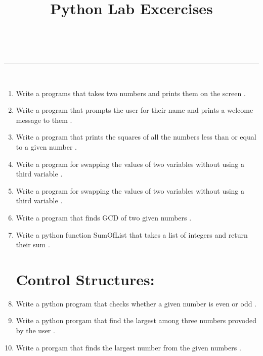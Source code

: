 \documentclass[a4paper,11pt]{article}
\makeatletter
\newcommand{\linia}{\rule{\linewidth}{0.5pt}}
\theoremstyle{mytheor}
\renewcommand{\maketitle}{
\begin{center}
\vspace{2ex}
{\huge \textsc{\@title}}
\vspace{1ex}
\\
\linia\\
\@author \hfill \@date
\vspace{4ex}
\end{center}
}
\makeatother
\begin{document}
\title{Python Lab Excercises}

\maketitle
\begin{enumerate}
\section{Basic Syntax:}
	\item Write a programs that takes two numbers and prints them on the screen .
	\item Write a program that prompts the user for their name and prints a welcome message to them .
	\item Write a program that prints the squares of all the numbers less than or equal to a given number .
	\item Write a program for swapping the values of two variables without using a third variable .
	\item Write a program for swapping the values of two variables without using a third variable .
	\item Write a program that finds GCD of two given numbers .
	\item Write a python function SumOfList that takes a list of integers and return their sum .
\section{Control Structures:}
	\item Write a python program that checks whether a given number is even or odd .
	\item Write a python prorgam that find the largest among three numbers provoded by the user .
	\item Write a prorgam that finds the largest number from the given numbers .

\end{enumerate}
\end{document}
